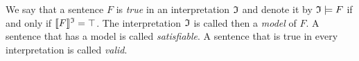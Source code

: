 We say that a sentence $F$ is {\em true} in an interpretation $\mathfrak{I}$
and denote it by $\mathfrak{I} \models F$ if and only if $\llbracket F\rrbracket^{\mathfrak{I}} = \top$.
The interpretation $\mathfrak{I}$ is called then a {\em model\/} of $F$.
A sentence that has a model is called {\em satisfiable}.
A sentence that is true in every interpretation is called {\em valid}.

\newpage
